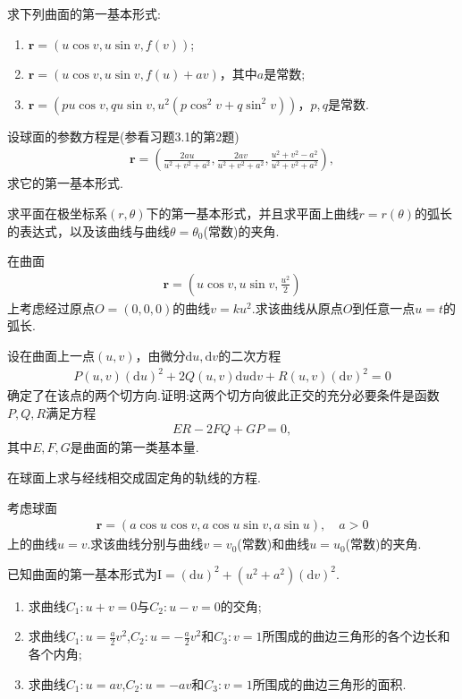 \documentclass[../../main.tex]{subfiles}%
\begin{document}
\begin{example}
求下列曲面的第一基本形式:
\begin{enumerate}[(1)]
\item $\boldsymbol{r}=(u\cos v,u\sin v,f(v))$;
\item $\boldsymbol{r}=(u\cos v,u\sin v,f(u)+av)$，其中$a$是常数;
\item $\boldsymbol{r}=(pu\cos v,qu\sin v,u^{2}(p\cos^{2}v+q\sin^{2}v))$，$p,q$是常数.
\end{enumerate}

设球面的参数方程是(参看习题3.1的第2题)
\begin{align*}
\boldsymbol{r}=\left(\frac{2au}{u^{2}+v^{2}+a^{2}},\frac{2av}{u^{2}+v^{2}+a^{2}},\frac{u^{2}+v^{2}-a^{2}}{u^{2}+v^{2}+a^{2}}\right),
\end{align*}
求它的第一基本形式.

求平面在极坐标系$(r,\theta)$下的第一基本形式，并且求平面上曲线$r=r(\theta)$的弧长的表达式，以及该曲线与曲线$\theta=\theta_{0}$(常数)的夹角.
\end{example}

\begin{example}
在曲面
\begin{align*}
\boldsymbol{r}=\left(u\cos v,u\sin v,\frac{u^{2}}{2}\right)
\end{align*}
上考虑经过原点$O=(0,0,0)$的曲线$v=ku^{2}$.求该曲线从原点$O$到任意一点$u=t$的弧长.

设在曲面上一点$(u,v)$，由微分$\mathrm{d}u,\mathrm{d}v$的二次方程
\begin{align*}
P(u,v)(\mathrm{d}u)^{2}+2Q(u,v)\mathrm{d}u\mathrm{d}v+R(u,v)(\mathrm{d}v)^{2}=0
\end{align*}
确定了在该点的两个切方向.证明:这两个切方向彼此正交的充分必要条件是函数$P,Q,R$满足方程
\begin{align*}
ER-2FQ+GP=0,
\end{align*}
其中$E,F,G$是曲面的第一类基本量.

在球面上求与经线相交成固定角的轨线的方程.

考虑球面
\begin{align*}
\boldsymbol{r}=(a\cos u\cos v,a\cos u\sin v,a\sin u),\quad a>0
\end{align*}
上的曲线$u=v$.求该曲线分别与曲线$v=v_{0}$(常数)和曲线$u=u_{0}$(常数)的夹角.

已知曲面的第一基本形式为$\mathrm{I}=(\mathrm{d}u)^{2}+(u^{2}+a^{2})(\mathrm{d}v)^{2}$.
\begin{enumerate}[(1)]
\item 求曲线$C_{1}:u+v=0$与$C_{2}:u-v=0$的交角;
\item 求曲线$C_{1}:u=\frac{a}{2}v^{2}$,$C_{2}:u=-\frac{a}{2}v^{2}$和$C_{3}:v=1$所围成的曲边三角形的各个边长和各个内角;
\item 求曲线$C_{1}:u=av$,$C_{2}:u=-av$和$C_{3}:v=1$所围成的曲边三角形的面积.
\end{enumerate}
\end{example}
\end{document}
